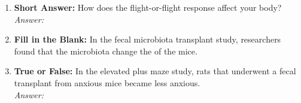 \begin{enumerate}[label=\textbf{Q1.1.\arabic*}]
      \item \textbf{Short Answer:} How does the flight-or-flight response affect your body? \\
            \textit{Answer:} \\%

      \item \textbf{Fill in the Blank:} In the fecal microbiota transplant study, researchers found that the microbiota change the \underline{\hspace{3cm}} of the mice. \\

      \item \textbf{True or False:} In the elevated plus maze study, rats that underwent a fecal transplant from anxious mice became less anxious. \\
            \textit{Answer:} %
\end{enumerate}

